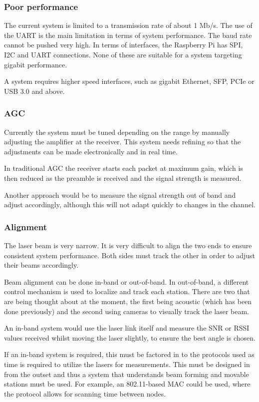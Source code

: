 \subsubsection{Poor performance}
The current system is limited to a transmission rate of about 1 Mb/s. The use
of the UART is the main limitation in terms of system performance. The baud
rate cannot be pushed very high. In terms of interfaces, the Raspberry Pi has
SPI, I2C and UART connections. None of these are suitable for a system
targeting gigabit performance.

A system requires higher speed interfaces, such as gigabit Ethernet,
\ac{SFP}, \ac{PCIe} or \ac{USB} 3.0 and above.

\subsubsection{\ac{AGC}}
Currently the system must be tuned depending on the range by manually
adjusting the amplifier at the receiver. This system needs refining so that
the adjustments can be made electronically and in real time.

In traditional \ac{AGC} the receiver starts each packet at maximum gain,
which is then reduced as the preamble is received and the signal strength
is measured.

Another approach would be to measure the signal strength out of band and
adjust accordingly, although this will not adapt quickly to changes in the
channel.

\subsubsection{Alignment}
The laser beam is very narrow. It is very difficult to align the two ends
to ensure consistent system performance. Both sides must track the other in
order to adjust their beams accordingly.

Beam alignment can be done in-band or out-of-band. In out-of-band, a different
control mechanism is used to localize and track each station. There are two
that are being thought about at the moment, the first being acoustic (which
has been done previously) and the second using cameras to visually track the
laser beam.

An in-band system would use the laser link itself and measure the \ac{SNR} or
\ac{RSSI} values received whilst moving the laser slightly, to ensure the best
angle is chosen.

If an in-band system is required, this must be factored in to the protocols
used as time is required to utilize the lasers for measurements. This must
be designed in from the outset and thus a system that understands beam forming
and movable stations must be used. For example, an 802.11-based \ac{MAC} could
be used, where the protocol allows for scanning time between nodes.
